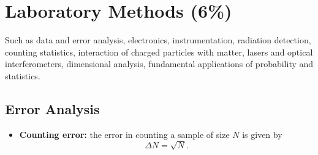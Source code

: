 \documentclass[%
 reprint,
superscriptaddress,
 amsmath,amssymb,
 aps,
prc,
]{revtex4-1}
\begin{document}
\section{Laboratory Methods (6\%)}
Such as data and error analysis, electronics, instrumentation, radiation detection, counting statistics, interaction of charged particles with matter, lasers and optical interferometers, dimensional analysis, fundamental applications of probability and statistics.

\subsection{Error Analysis}
\begin{itemize}
	\item \textbf{Counting error:} the error in counting a sample of size $N$ is given by
	\begin{equation}
		\Delta N = \sqrt{N}.
	\end{equation}
\end{itemize}
\end{document}
